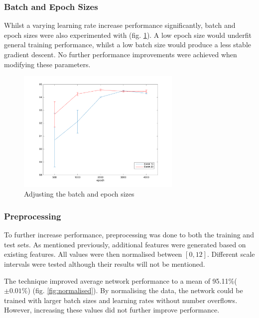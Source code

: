 \documentclass[11]{article}
\begin{document}
\subsubsection{Batch and Epoch Sizes}
Whilst a varying learning rate increase performance significantly, batch and epoch sizes were also experimented with (fig. \ref{fig:batchandepoch}). A low epoch size would underfit general training performance, whilst a low batch size would produce a less stable gradient descent. No further performance improvements were achieved when modifying these parameters. 

\begin{figure}[h]
\centering
\includegraphics[width=0.7\textwidth]{batchandepoch.png}
\caption{Adjusting the batch and epoch sizes}
\label{fig:batchandepoch}
\end{figure}

\subsubsection{Preprocessing}
To further increase performance, preprocessing was done to both the training and test sets. As mentioned previously, additional features were generated based on existing features. All values were then normalised between $[0,12]$. Different scale intervals were tested although their results will not be mentioned. 

The technique improved average network performance to a mean of 95.11\%($\pm 0.01\%$) (fig. \ref{fig:normalised}). By normalising the data, the network could be trained with larger batch sizes and learning rates without number overflows. However, increasing these values did not further improve performance. 
\end{document}
